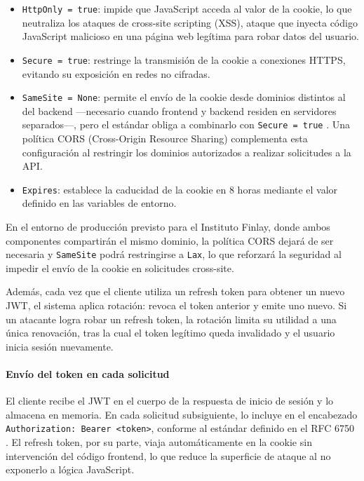 \begin{itemize}
    \item \texttt{HttpOnly = true}: impide que JavaScript acceda al valor de la cookie, lo que neutraliza los ataques de cross-site scripting (XSS), ataque que inyecta código JavaScript malicioso en una página web legítima para robar datos del usuario\cite{owasp_httponly}.
    \item \texttt{Secure = true}: restringe la transmisión de la cookie a conexiones HTTPS, evitando su exposición en redes no cifradas.
    \item \texttt{SameSite = None}: permite el envío de la cookie desde dominios distintos al del backend —necesario cuando frontend y backend residen en servidores separados—, pero el estándar obliga a combinarlo con \texttt{Secure = true} \cite{owasp_cookies}. 
Una política CORS (Cross-Origin Resource Sharing) complementa esta configuración al restringir los dominios autorizados a realizar solicitudes a la API.
    \item \texttt{Expires}: establece la caducidad de la cookie en 8 horas mediante el valor definido en las variables de entorno.
\end{itemize}

En el entorno de producción previsto para el Instituto Finlay, donde ambos componentes compartirán el mismo dominio, la política CORS dejará de ser necesaria y \texttt{SameSite} podrá restringirse a \texttt{Lax}, lo que reforzará la seguridad al impedir el envío de la cookie en solicitudes cross-site.

Además, cada vez que el cliente utiliza un refresh token para obtener un nuevo JWT, el sistema aplica rotación: revoca el token anterior y emite uno nuevo. Si un atacante logra robar un refresh token, la rotación limita su utilidad a una única renovación, tras la cual el token legítimo queda invalidado y el usuario inicia sesión nuevamente.

\paragraph{Envío del token en cada solicitud}

El cliente recibe el JWT en el cuerpo de la respuesta de inicio de sesión y lo almacena en memoria. En cada solicitud subsiguiente, lo incluye en el encabezado \texttt{Authorization: Bearer <token>}, conforme al estándar definido en el RFC 6750 \cite{rfc6750}. El refresh token, por su parte, viaja automáticamente en la cookie sin intervención del código frontend, lo que reduce la superficie de ataque al no exponerlo a lógica JavaScript.

